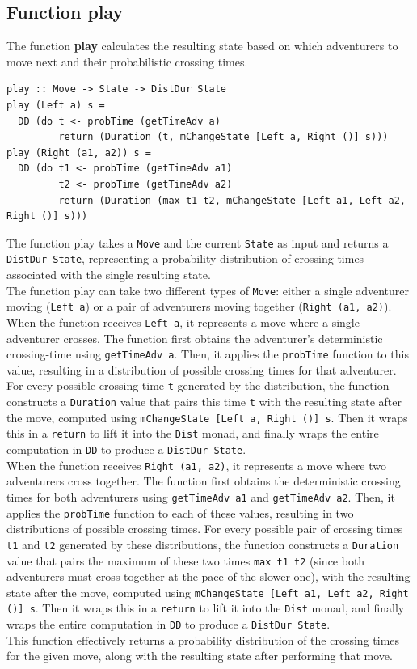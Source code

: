 \documentclass[a4paper,12pt]{report}
\begin{document}
\subsection{Function play}
The function \textbf{play} calculates the resulting state based on which adventurers to move next
and their probabilistic crossing times.
\begin{verbatim}
play :: Move -> State -> DistDur State
play (Left a) s =
  DD (do t <- probTime (getTimeAdv a)
         return (Duration (t, mChangeState [Left a, Right ()] s)))
play (Right (a1, a2)) s =
  DD (do t1 <- probTime (getTimeAdv a1)
         t2 <- probTime (getTimeAdv a2)
         return (Duration (max t1 t2, mChangeState [Left a1, Left a2, Right ()] s)))
\end{verbatim}
The function play takes a \texttt{Move} and the current \texttt{State}
as input and returns a \texttt{DistDur State}, representing a
probability distribution of crossing times associated with the
single resulting state.
\\[1em]
The function play can take two different types of \texttt{Move}:
either a single adventurer moving (\texttt{Left a}) or a pair of adventurers
moving together (\texttt{Right (a1, a2)}).
\\[1em]
When the function receives \texttt{Left a}, it represents a move where a
single adventurer crosses. The function first obtains the adventurer's
deterministic crossing-time using \texttt{getTimeAdv a}. Then, it applies
the \texttt{probTime} function to this value, resulting in a distribution of
possible crossing times for that adventurer. For every possible crossing time
\texttt{t} generated by the distribution, the function constructs a
\texttt{Duration} value that pairs this time \texttt{t} with the
resulting state after the move, computed using
\texttt{mChangeState [Left a, Right ()] s}. Then it wraps this
in a \texttt{return} to lift it into the \texttt{Dist} monad, and finally
wraps the entire computation in \texttt{DD} to produce a \texttt{DistDur State}.
\\[1em]
When the function receives \texttt{Right (a1, a2)}, it represents a move
where two adventurers cross together. The function first obtains the
deterministic crossing times for both adventurers using
\texttt{getTimeAdv a1} and \texttt{getTimeAdv a2}. Then, it applies
the \texttt{probTime} function to each of these values, resulting in
two distributions of possible crossing times. For every possible pair of
crossing times \texttt{t1} and \texttt{t2} generated by these distributions,
the function constructs a \texttt{Duration} value that pairs the maximum of
these two times \texttt{max t1 t2} (since both adventurers must cross
together at the pace of the slower one), with the resulting state
after the move, computed using
\texttt{mChangeState [Left a1, Left a2, Right ()] s}. Then it wraps this
in a \texttt{return} to lift it into the \texttt{Dist} monad, and finally
wraps the entire computation in \texttt{DD} to produce a \texttt{DistDur State}.
\\[1em]
This function effectively returns a probability distribution
of the crossing times for the given move,
along with the resulting state after performing that move.
\end{document}
